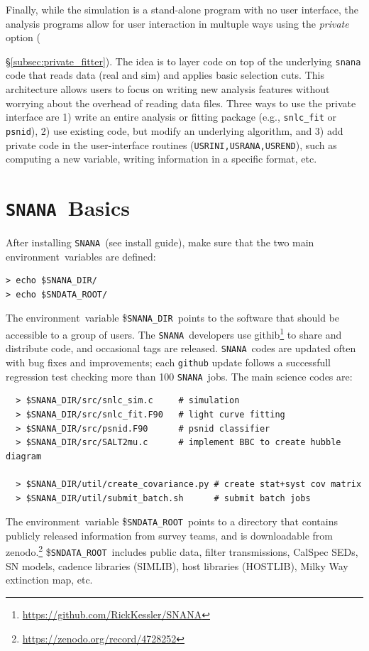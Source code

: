 \documentclass[12pt]{article}
\newcommand{\env}{environment}
\newcommand{\snana}{{\tt SNANA}}
\newcommand{\snanadir}{{\tt SNANA\_DIR}}
\newcommand{\sndataroot}{{\tt SNDATA\_ROOT}}
\begin{document}
Finally, while the simulation is a stand-alone program
with no user interface, the analysis programs allow for
user interaction in multuple ways using the {\it private}
option ({\S\ref{subsec:private_fitter}). The idea is
to layer code on top of the underlying {\tt snana} code that
reads data (real and sim) and applies basic selection cuts.
This architecture allows users to focus on writing new  
analysis features without worrying about the overhead of 
reading data files.
Three ways to use the private interface are
1) write an entire analysis or fitting package
(e.g., {\tt snlc\_fit} or {\tt psnid}),
2) use existing code, but modify an underlying algorithm, and
3) add private code in the user-interface routines 
({\tt USRINI,USRANA,USREND}), such as computing a new variable,
writing information in a specific format, etc.


\clearpage
   \section{\snana\ Basics}
   \label{sec:basics}

After installing \snana\ (see install guide), make sure
that the two main \env\ variables are defined:
%
\begin{verbatim}
> echo $SNANA_DIR/
> echo $SNDATA_ROOT/
\end{verbatim}
%
The \env\ variable \$\snanadir\ points to the software that
should be accessible to a group of users.
The \snana\ developers use 
githib\footnote{\url{https://github.com/RickKessler/SNANA}}
to share and distribute code, and occasional tags are released.
\snana\ codes are updated often with bug fixes and improvements;
each {\tt github} update follows a successfull regression test checking
more than 100 \snana\ jobs.
The main science codes are:
\begin{verbatim}
  > $SNANA_DIR/src/snlc_sim.c     # simulation
  > $SNANA_DIR/src/snlc_fit.F90   # light curve fitting
  > $SNANA_DIR/src/psnid.F90      # psnid classifier
  > $SNANA_DIR/src/SALT2mu.c      # implement BBC to create hubble diagram

  > $SNANA_DIR/util/create_covariance.py # create stat+syst cov matrix
  > $SNANA_DIR/util/submit_batch.sh      # submit batch jobs
\end{verbatim}
%
The \env\ variable \$\sndataroot\ points to a directory that
contains publicly released information from survey teams,
and is downloadable from 
zenodo.\footnote{\url{https://zenodo.org/record/4728252}}
\$\sndataroot\ includes 
public data, 
filter transmissions,
CalSpec SEDs, 
SN models,
cadence libraries (SIMLIB),
host libraries (HOSTLIB),
Milky Way extinction map, etc.


}
\end{document}
